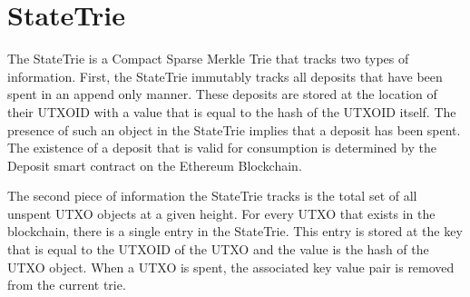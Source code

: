 \section{StateTrie}

The StateTrie is a Compact Sparse Merkle Trie that tracks two types of
information.
First, the StateTrie immutably tracks all deposits that have been spent in an
append only manner.
These deposits are stored at the location of their UTXOID with a value that is
equal to the hash of the UTXOID itself.
The presence of such an object in the StateTrie implies that a deposit has been
spent.
The existence of a deposit that is valid for consumption is determined by the
Deposit smart contract on the Ethereum Blockchain.

The second piece of information the StateTrie tracks is the total set of all
unspent UTXO objects at a given height.
For every UTXO that exists in the blockchain, there is a single entry in the
StateTrie.
This entry is stored at the key that is equal to the UTXOID of the UTXO and the
value is the hash of the UTXO object.
When a UTXO is spent, the associated key value pair is removed from the current
trie.
